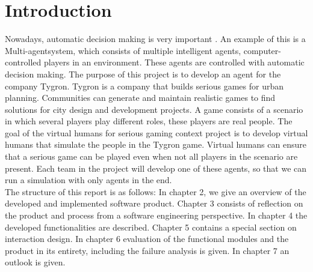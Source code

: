 \chapter{Introduction}
Nowadays, automatic decision making is very important \cite{Lizheng2010}. An example of this is a Multi-agentsystem, which consists of multiple intelligent agents, computer-controlled players in an environment. These agents are controlled with automatic decision making. The purpose of this project is to develop an agent for the company Tygron. Tygron is a company that builds serious games for urban planning. Communities can generate and maintain realistic games to find solutions for city design and development projects. A game consists of a scenario in which several players play different roles, these players are real people. The goal of the virtual humans for serious gaming context project is to develop virtual humans that simulate the people in the Tygron game. Virtual humans can ensure that a serious game can be played even when not all players in the scenario are present. Each team in the project will develop one of these agents, so that we can run a simulation with only agents in the end.\\

The structure of this report is as follows:
In chapter 2, we give an overview of the developed and implemented software product. Chapter 3 consists of reflection on the product and process from a software engineering perspective. In chapter 4 the developed functionalities are described. Chapter 5 contains a special section on interaction design. In chapter 6 evaluation of the functional modules and the product in its entirety, including the failure analysis is given. In chapter 7 an outlook is given.
